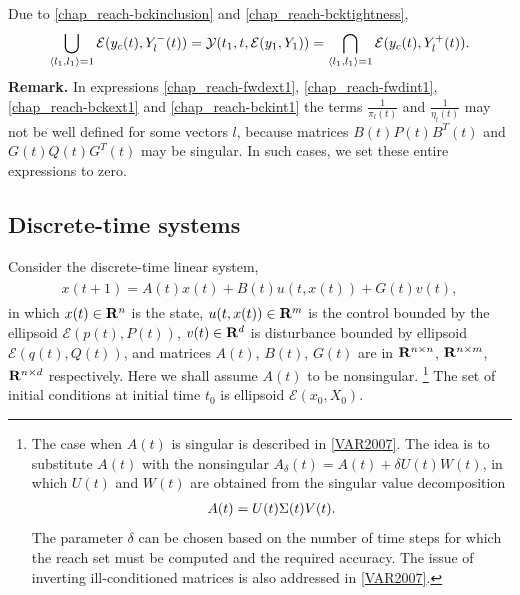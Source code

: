 \documentclass[letterpaper,10pt,english]{sphinxmanual}
\begin{document}
Due to \eqref{chap_reach-bckinclusion} and \eqref{chap_reach-bcktightness},
\begin{gather}
\begin{split}\bigcup_{\langle l_1,l_1\rangle=1}{\mathcal E}(y_c(t),Y^-_l(t)) =
{\mathcal Y}(t_1,t,{\mathcal E}(y_1,Y_1)) =
\bigcap_{\langle l_1,l_1\rangle=1}{\mathcal E}(y_c(t),Y^+_l(t)).\end{split}\notag
\end{gather}
\textbf{Remark.} In expressions \eqref{chap_reach-fwdext1}, \eqref{chap_reach-fwdint1}, \eqref{chap_reach-bckext1} and
\eqref{chap_reach-bckint1} the terms \(\frac{1}{\pi_l(t)}\) and
\(\frac{1}{\eta_l(t)}\) may not be well defined for some vectors
\(l\), because matrices \(B(t)P(t)B^T(t)\) and
\(G(t)Q(t)G^T(t)\) may be singular. In such cases, we set these
entire expressions to zero.


\subsection{Discrete-time systems}
\label{chap_reach:discrete-time-systems}
Consider the discrete-time linear system,
\label{chap_reach:equation-dtsystem}\begin{gather}
\begin{split}x(t+1) = A(t)x(t) + B(t)u(t,x(t)) + G(t)v(t),\end{split}\label{chap_reach-dtsystem}
\end{gather}
in which \(x(t)\in{\bf R}^n\) is the state,
\(u(t, x(t))\in{\bf R}^m\) is the control bounded by the ellipsoid
\({\mathcal E}(p(t),P(t))\), \(v(t)\in{\bf R}^d\) is disturbance
bounded by ellipsoid \({\mathcal E}(q(t),Q(t))\), and matrices
\(A(t)\), \(B(t)\), \(G(t)\) are in
\({\bf R}^{n\times n}\), \({\bf R}^{n\times m}\),
\({\bf R}^{n\times d}\) respectively. Here we shall assume
\(A(t)\) to be nonsingular. \footnote{
The case when \(A(t)\) is singular is described in {\hyperref[chap_reach:var2007]{{[}VAR2007{]}}}.
The idea is to substitute \(A(t)\) with the
nonsingular \(A_\delta(t) = A(t) + \delta U(t)W(t)\), in which
\(U(t)\) and \(W(t)\) are obtained from the singular value
decomposition
\begin{gather}
\begin{split}A(t) = U(t)\Sigma(t)V(t) .\end{split}\notag
\end{gather}
The parameter \(\delta\) can be chosen based on the number of
time steps for which the reach set must be computed and the required
accuracy. The issue of inverting ill-conditioned matrices is also
addressed in {\hyperref[chap_reach:var2007]{{[}VAR2007{]}}}.
} The set of initial conditions at
initial time \(t_0\) is ellipsoid \({\mathcal E}(x_0,X_0)\).
\end{document}
